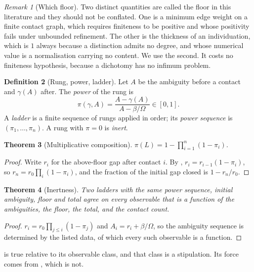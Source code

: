 \documentclass[11pt,a4paper]{article}
\theoremstyle{clthm}
\newtheorem{theorem}{Theorem}[section]
\theoremstyle{definition}
\newtheorem{definition}[theorem]{Definition}
\theoremstyle{remark}
\newtheorem{remark}[theorem]{Remark}
\newcommand{\flo}{\beta}
\newcommand{\pow}{\pi}
\newcommand{\Lad}{L}
\newcommand{\Rung}{\gamma}
\newcommand{\Tot}{\Omega}
\begin{document}
\begin{remark}[Which floor]
\label{rem:whichfloor}
Two distinct quantities are called the floor in this literature and they
should not be conflated. One is a minimum edge weight on a finite contact
graph, which requires finiteness to be positive and whose positivity fails
under unbounded refinement. The other is the thickness of an
individuation, which is $1$ always because a distinction admits no degree,
and whose numerical value is a normalisation carrying no content. We use
the second. It costs no finiteness hypothesis, because a dichotomy has no
infimum problem.
\end{remark}

\begin{definition}[Rung, power, ladder]
\label{def:rung}
Let $A$ be the ambiguity before a contact and $\Rung(A)$ after. The
\emph{power} of the rung is
\begin{equation}
\pow(\Rung,A)=\frac{A-\Rung(A)}{A-\flo/\Tot}\in[0,1].
\label{eq:power}
\end{equation}
A \emph{ladder} is a finite sequence of rungs applied in order; its
\emph{power sequence} is $(\pow_1,\dots,\pow_n)$. A rung with $\pow=0$ is
\emph{inert}.
\end{definition}

\begin{theorem}[Multiplicative composition]
\label{thm:mult}
$\pow(\Lad)=1-\prod_{i=1}^{n}(1-\pow_i)$.
\end{theorem}

\begin{proof}
Write $r_i$ for the above-floor gap after contact $i$. By
, $r_i=r_{i-1}(1-\pow_i)$, so
$r_n=r_0\prod_i(1-\pow_i)$, and the fraction of the initial gap closed is
$1-r_n/r_0$.
\end{proof}

\begin{theorem}[Inertness]
\label{thm:inertness}
Two ladders with the same power sequence, initial ambiguity, floor and
total agree on every observable that is a function of the ambiguities, the
floor, the total, and the contact count.
\end{theorem}

\begin{proof}
$r_i=r_0\prod_{j\le i}(1-\pow_j)$ and $A_i=r_i+\flo/\Tot$, so the
ambiguity sequence is determined by the listed data, of which every such
observable is a function.
\end{proof}

 is true relative to its observable class, and that
class is a stipulation. Its force comes from , which is not.
\end{document}
